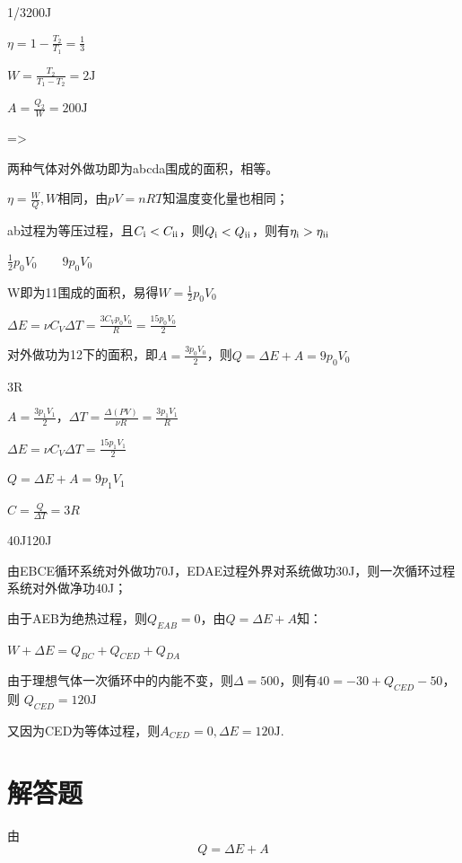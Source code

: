 \documentclass[b5paper,opensource]{./template/qyxf-book}
\newcommand{\RNum}[1]{\uppercase\expandafter{\romannumeral #1\relax}}%
\begin{document}
1/3\qquad200J

\solve
$\eta =1-\frac{T_2}{T_1}=\frac{1}{3}$

$W=\frac{T_2}{T_1-T_2}=2\mathrm{J}$

$A=\frac{Q_2}{W}=200\mathrm{J}$

=\qquad >

\solve 两种气体对外做功即为abcda围成的面积，相等。

$\eta=\frac{W}{Q},W$相同，由$pV=nRT$知温度变化量也相同；

ab过程为等压过程，且$C_{\text{\RNum{1}}}<C_\text{\RNum{2}}$，则$Q_{\text{\RNum{1}}}<Q_{\text{\RNum{2}}}$，则有$\eta_{\text{\RNum{1}}}>\eta_{\text{\RNum{2}}}$

$\frac{1}{2}p_0V_0\qquad 9p_0V_0$

\solve W即为1\to1围成的面积，易得$W=\frac{1}{2}p_0V_0$

$\Delta E=\nu C_V\Delta T=\frac{3C_Vp_0V_0}{R}=\frac{15p_0V_0}{2}$

对外做功为1\to2下的面积，即$A=\frac{3p_0V_0}{2}$，则$Q=\Delta E+A=9p_0V_0$

3R

\solve
$A=\frac{3p_1V_1}{2}$，$\Delta T=\frac{\Delta(PV)}{\nu R}=\frac{3p_1V_1}{R}$

$\Delta E=\nu C_V\Delta T=\frac{15p_1V_1}{2}$

$Q=\Delta E+A=9p_1V_1$

\therefore$C=\frac{Q}{\Delta T}=3R$

40J\qquad 120J

\solve 由EBCE循环系统对外做功70J，EDAE过程外界对系统做功30J，则一次循环过程系统对外做净功40J；

由于AEB为绝热过程，则$Q_{EAB}=0$，由$Q=\Delta E+A$知：

$W+\Delta E=Q_{BC}+Q_{CED}+Q_{DA}$

由于理想气体一次循环中的内能不变，则$\Delta=500$，则有$40=-30+Q_{CED}-50$，则
$Q_{CED}=120\mathrm{J}$

又因为CED为等体过程，则$A_{CED}=0,\Delta E=120\mathrm{J}$.

\section{解答题}


\solve 由\[Q = \Delta E + A\]
\end{document}
